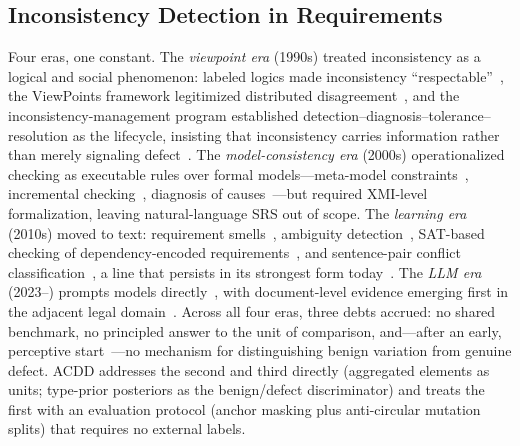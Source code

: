 \documentclass[10pt,twocolumn]{article}
\begin{document}
\subsection{Inconsistency Detection in Requirements}
Four eras, one constant.  The \emph{viewpoint era} (1990s) treated
inconsistency as a logical and social phenomenon: labeled logics made
inconsistency ``respectable''~\cite{gabbay1991making}, the ViewPoints
framework legitimized distributed
disagreement~\cite{finkelstein1992viewpoints}, and the
inconsistency-management program established
detection--diagnosis--tolerance--resolution as the lifecycle, insisting
that inconsistency carries information rather than merely
signaling defect~\cite{hunter1998managing,nuseibeh2000making}.
The \emph{model-consistency era} (2000s) operationalized checking as
executable rules over formal models---meta-model
constraints~\cite{engels2001consistent}, incremental
checking~\cite{egyed2006instant}, diagnosis of
causes~\cite{reder2013diagnosing}---but required XMI-level
formalization, leaving natural-language SRS out of scope.
The \emph{learning era} (2010s) moved to text: requirement
smells~\cite{femmer2017smells}, ambiguity
detection~\cite{chantree2006nocuous,ezzini2022reference}, SAT-based
checking of dependency-encoded
requirements~\cite{bendik2017checking}, and sentence-pair conflict
classification~\cite{guo2021fine,malik2022s3cda}, a line that
persists in its strongest form
today~\cite{wang2025tsrcdf}.  The \emph{LLM era} (2023--) prompts
models directly~\cite{fantechi2023chatgpt,hasanain2026arareq}, with
document-level evidence emerging first in the adjacent legal
domain~\cite{legalwiz2025}.
Across all four eras, three debts accrued: no shared benchmark, no
principled answer to the unit of comparison, and---after an early,
perceptive start~\cite{chantree2006nocuous}---no mechanism for
distinguishing benign variation from genuine defect.  ACDD addresses
the second and third directly (aggregated elements as units;
type-prior posteriors as the benign/defect discriminator) and treats
the first with an evaluation protocol (anchor masking plus
anti-circular mutation splits) that requires no external labels.
\end{document}
